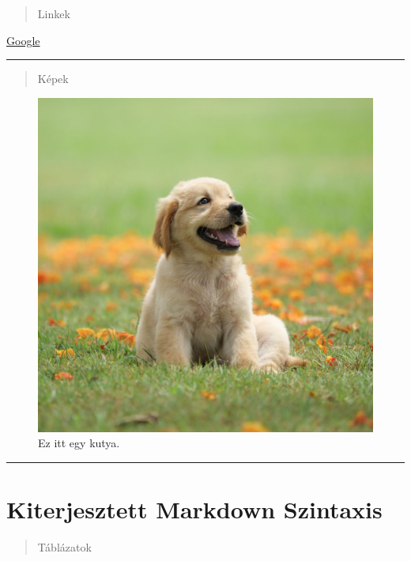 \documentclass[
]{article}
\begin{document}
\begin{quote}
Linkek
\end{quote}

\href{https://www.google.com}{Google}

\begin{center}\rule{0.5\linewidth}{0.5pt}\end{center}

\begin{quote}
Képek
\end{quote}

\begin{figure}
\centering
\includegraphics{dog.jpg}
\caption{Ez itt egy kutya.}
\end{figure}

\begin{center}\rule{0.5\linewidth}{0.5pt}\end{center}

\hypertarget{kiterjesztett-markdown-szintaxis}{%
\section{Kiterjesztett Markdown
Szintaxis}\label{kiterjesztett-markdown-szintaxis}}

\begin{quote}
Táblázatok
\end{quote}
\end{document}
